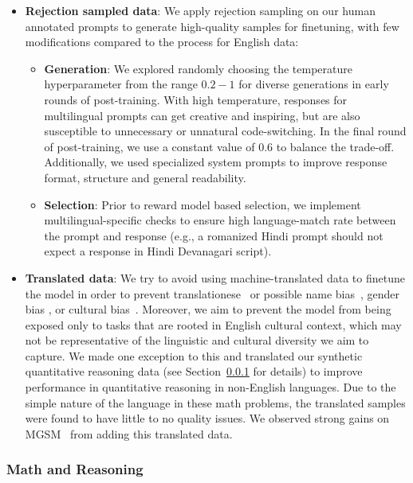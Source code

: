 \begin{itemize}
        \item \textbf{Rejection sampled data}: We apply rejection sampling on our human annotated prompts to generate high-quality samples for finetuning, with few modifications compared to the process for English data: 
            \begin{itemize} 
                \item \textbf{Generation}: 
                We explored randomly choosing the temperature hyperparameter from the range $0.2-1$ for diverse generations in early rounds of post-training. %
                With high temperature, responses for multilingual prompts can get creative and inspiring, but are also susceptible to unnecessary or unnatural code-switching. In the final round of post-training, we use a constant value of 0.6 to balance the trade-off. Additionally, we used specialized system prompts to improve response format, structure and general readability. 
                \item \textbf{Selection}: Prior to reward model based selection, we implement multilingual-specific checks to ensure high language-match rate between the prompt and response (e.g., a romanized Hindi prompt should not expect a response in Hindi Devanagari script). %
            \end{itemize}
        \item \textbf{Translated data}: We try to avoid using machine-translated data to finetune the model in order to prevent translationese~\citep{bizzoni-etal-2020-human,muennighoff2023crosslingual} or possible name bias~\citep{wang-etal-2022-measuring}, gender bias \citep{10.1162/tacl_a_00401}, or cultural bias~\citep{Ji_Ji_Bouillon_Seligman_2023}. Moreover, we aim to prevent the model from being exposed only to tasks that are rooted in English cultural context, which may not be representative of the linguistic and cultural diversity we aim to capture. We made one exception to this and translated our synthetic quantitative reasoning data (see Section~\ref{subsubsec:reasoning} for details) to improve performance in quantitative reasoning in non-English languages.
        Due to the simple nature of the language in these math problems, the translated samples were found to have little to no quality issues. We observed strong gains on MGSM~\citep{shi2022languagemodelsmultilingualchainofthought} from adding this translated data. 
\end{itemize}

\subsubsection{Math and Reasoning}
\label{subsubsec:reasoning}

